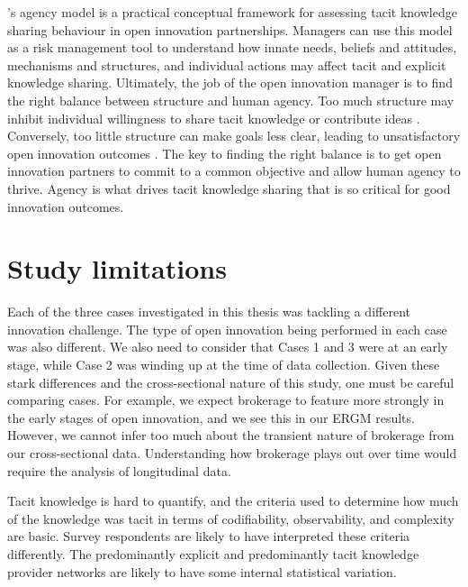 \citeauthor{loyal2001agency}'s \citeyearpar{loyal2001agency} agency model is a practical conceptual framework for assessing tacit knowledge sharing behaviour in open innovation partnerships. Managers can use this model as a risk management tool to understand how innate needs, beliefs and attitudes, mechanisms and structures, and individual actions may affect tacit and explicit knowledge sharing. Ultimately, the job of the open innovation manager is to find the right balance between structure and human agency. Too much structure may inhibit individual willingness to share tacit knowledge or contribute ideas \citep{al2021understanding}. Conversely, too little structure can make goals less clear, leading to unsatisfactory open innovation outcomes \citep{nunes2020managing}. The key to finding the right balance is to get open innovation partners to commit to a common objective and allow human agency to thrive. Agency is what drives tacit knowledge sharing that is so critical for good innovation outcomes.


 \section{Study limitations}
 
 Each of the three cases investigated in this thesis was tackling a different innovation challenge. The type of open innovation being performed in each case was also different. We also need to consider that Cases 1 and 3 were at an early stage, while Case 2 was winding up at the time of data collection. Given these stark differences and the cross-sectional nature of this study, one must be careful comparing cases. For example, we expect brokerage to feature more strongly in the early stages of open innovation, and we see this in our ERGM results. However, we cannot infer too much about the transient nature of brokerage from our cross-sectional data. Understanding how brokerage plays out over time would require the analysis of longitudinal data. \medskip

Tacit knowledge is hard to quantify, and the criteria used to determine how much of the knowledge was tacit in terms of codifiability, observability, and complexity are basic. Survey respondents are likely to have interpreted these criteria differently. The predominantly explicit and predominantly tacit knowledge provider networks are likely to have some internal statistical variation. \medskip

